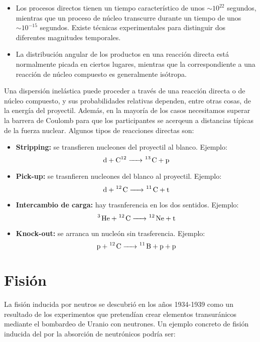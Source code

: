 \begin{itemize}
	\item Los procesos directos tienen un tiempo característico de unos $\sim 10^{22}$ segundos, mientras que un proceso de núcleo transcurre durante un tiempo de unos $\sim 10^{-15}$ segundos. Existe técnicas experimentales para distinguir dos diferentes magnitudes temporales.
	\item La distribución angular de los productos en una reacción directa está normalmente picada en ciertos lugares, mientras que la correspondiente a una reacción de núcleo compuesto es generalmente isótropa.
\end{itemize}
Una dispersión inelástica puede proceder a través de una reacción directa o de núcleo compuesto, y sus probabilidades relativas dependen, entre otras cosas, de la energía del proyectil. Además, en la mayoría de los casos necesitamos superar la barrera de Coulomb para que los participantes se acerqeun a distancias típicas de la fuerza nuclear. Algunos tipos de reacciones directas son:

\begin{itemize}
	\item \textbf{Stripping:} se transfieren nucleones del proyectil al blanco. Ejemplo:
	\begin{equation}
		\ce{d + C^12  -> ^13 C + p}
	\end{equation}
	\item \textbf{Pick-up:} se trasnfieren nucleones del blanco al proyectil. Ejemplo:
	\begin{equation}
		\ce{d +^12 C  -> ^11 C + t}
	\end{equation}
	\item \textbf{Intercambio de carga:} hay trasnferencia en los dos sentidos. Ejemplo:
	\begin{equation}
		\ce{^3 He + ^12 C -> ^12 Ne + t}
	\end{equation}
	\item \textbf{Knock-out:} se arranca un nucleón sin trasferencia. Ejemplo:
	\begin{equation}
		\ce{p + ^12 C -> ^11 B + p + p}
	\end{equation}
\end{itemize}


\section{Fisión}

La fisión inducida por neutros se descubrió en los años 1934-1939 como un resultado de los experimentos que pretendían crear elementos transuránicos mediante el bombardeo de Uranio con neutrones. Un ejemplo concreto de fisión inducida del  por la absorción de neutrónicos podría ser:

